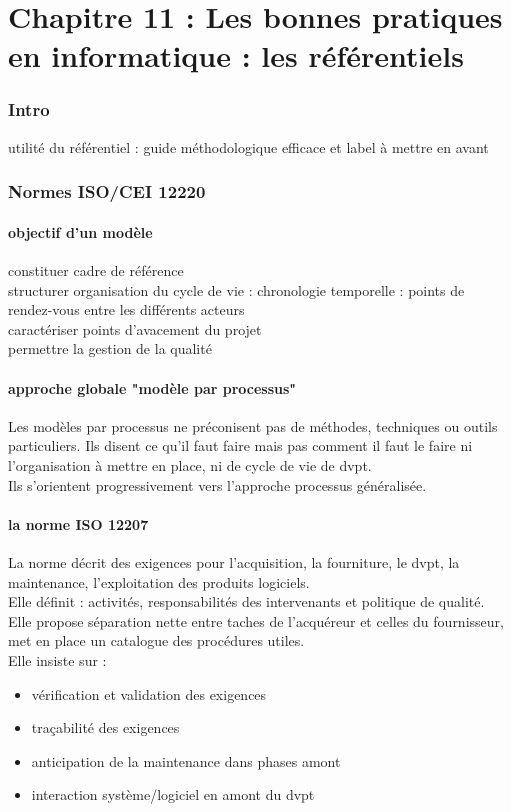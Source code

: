 \part{Chapitre 11 : Les bonnes pratiques en informatique : les référentiels}

\section{Intro}

utilité du référentiel : guide méthodologique efficace et label à mettre en avant

\section{Normes ISO/CEI 12220}

	\subsection{objectif d’un modèle}

constituer cadre de référence\\
structurer organisation du cycle de vie : chronologie temporelle : points de rendez-vous entre les différents acteurs\\
caractériser points d’avacement du projet\\
permettre la gestion de la qualité\\

	\subsection{approche globale "modèle par processus"}

Les modèles par processus ne préconisent pas de méthodes, techniques ou outils particuliers. Ils disent ce qu’il faut faire mais pas comment il faut le faire ni l’organisation à mettre en place, ni de cycle de vie de dvpt.\\
Ils s’orientent progressivement vers l’approche processus généralisée.

	\subsection{la norme ISO 12207}

La norme décrit des exigences pour l’acquisition, la fourniture, le dvpt, la maintenance, l’exploitation des produits logiciels.\\
Elle définit : activités, responsabilités des intervenants et politique de qualité.\\
Elle propose séparation nette entre taches de l’acquéreur et celles du fournisseur, met en place un catalogue des procédures utiles.\\
Elle insiste sur :
\begin{itemize}
\item vérification et validation des exigences
\item traçabilité des exigences
\item anticipation de la maintenance dans phases amont
\item interaction système/logiciel en amont du dvpt
\end{itemize}

